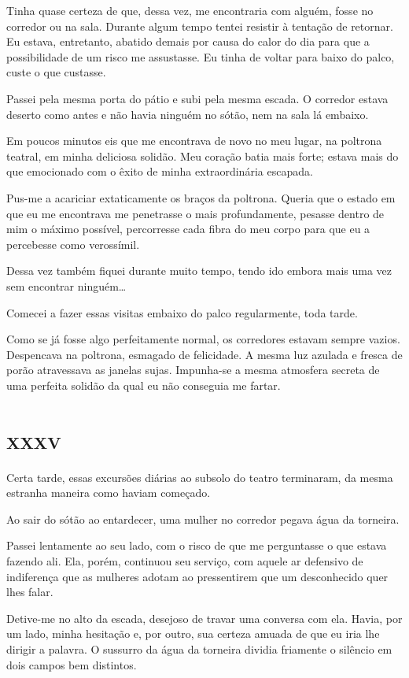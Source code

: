 Tinha quase certeza de que, dessa vez, me encontraria com alguém, fosse no corredor ou na sala. Durante algum tempo tentei resistir à tentação de retornar. Eu estava, entretanto, abatido demais por causa do calor do dia para que a possibilidade de um risco me assustasse. Eu tinha de voltar para baixo do palco, custe o que custasse.

Passei pela mesma porta do pátio e subi pela mesma escada. O corredor estava deserto como antes e não havia ninguém no sótão, nem na sala lá embaixo.

Em poucos minutos eis que me encontrava de novo no meu lugar, na poltrona teatral, em minha deliciosa solidão. Meu coração batia mais forte; estava mais do que emocionado com o êxito de minha extraordinária escapada.

Pus-me a acariciar extaticamente os braços da poltrona. Queria que o estado em que eu me encontrava me penetrasse o mais profundamente, pesasse dentro de mim o máximo possível, percorresse cada fibra do meu corpo para que eu a percebesse como verossímil.

Dessa vez também fiquei durante muito tempo, tendo ido embora mais uma vez sem encontrar ninguém\ldots{}

Comecei a fazer essas visitas embaixo do palco regularmente, toda tarde.

Como se já fosse algo perfeitamente normal, os corredores estavam sempre vazios. Despencava na poltrona, esmagado de felicidade. A mesma luz azulada e fresca de porão atravessava as janelas sujas. Impunha-se a mesma atmosfera secreta de uma perfeita solidão da qual eu não conseguia me fartar.


\chapter*{\huge\centering\textsc{xxxv}}

Certa tarde, essas excursões diárias ao subsolo do teatro terminaram, da mesma estranha maneira como haviam começado.

Ao sair do sótão ao entardecer, uma mulher no corredor pegava água da torneira.

Passei lentamente ao seu lado, com o risco de que me perguntasse o que estava fazendo ali. Ela, porém, continuou seu serviço, com aquele ar defensivo de indiferença que as mulheres adotam ao pressentirem que um desconhecido quer lhes falar.

Detive-me no alto da escada, desejoso de travar uma conversa com ela. Havia, por um lado, minha hesitação e, por outro, sua certeza amuada de que eu iria lhe dirigir a palavra. O sussurro da água da torneira dividia friamente o silêncio em dois campos bem distintos.

